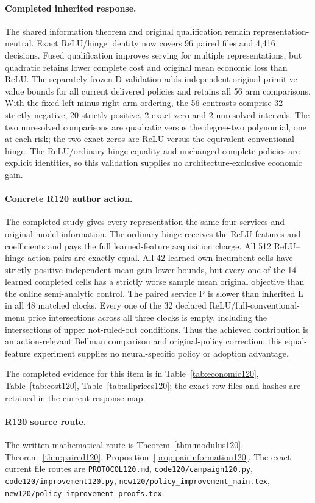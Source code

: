 \paragraph{Completed inherited response.}
The shared information theorem and original qualification remain representation-neutral. Exact ReLU/hinge identity now covers 96 paired files and 4,416 decisions. Fused qualification improves serving for multiple representations, but quadratic retains lower complete cost and original mean economic loss than ReLU. The separately frozen D validation adds independent original-primitive value bounds for all current delivered policies and retains all 56 arm comparisons. With the fixed left-minus-right arm ordering, the 56 contrasts comprise 32 strictly negative, 20 strictly positive, 2 exact-zero and 2 unresolved intervals. The two unresolved comparisons are quadratic versus the degree-two polynomial, one at each risk; the two exact zeros are ReLU versus the equivalent conventional hinge. The ReLU/ordinary-hinge equality and unchanged complete policies are explicit identities, so this validation supplies no architecture-exclusive economic gain.
\paragraph{Concrete R120 author action.}
The completed study gives every representation the same four services and original-model information. The ordinary hinge receives the ReLU features and coefficients and pays the full learned-feature acquisition charge. All 512 ReLU--hinge action pairs are exactly equal. All 42 learned own-incumbent cells have strictly positive independent mean-gain lower bounds, but every one of the 14 learned completed cells has a strictly worse sample mean original objective than the online semi-analytic control. The paired service P is slower than inherited L in all 48 matched clocks. Every one of the 32 declared ReLU/full-conventional-menu price intersections across all three clocks is empty, including the intersections of upper not-ruled-out conditions. Thus the achieved contribution is an action-relevant Bellman comparison and original-policy correction; this equal-feature experiment supplies no neural-specific policy or adoption advantage.

The completed evidence for this item is in Table~\ref{tab:economic120}, Table~\ref{tab:cost120}, Table~\ref{tab:allprices120}; the exact row files and hashes are retained in the current response map.
\paragraph{R120 source route.}
The written mathematical route is Theorem~\ref{thm:modulus120}, Theorem~\ref{thm:paired120}, Proposition~\ref{prop:pairinformation120}. The exact current file routes are \nolinkurl{PROTOCOL120.md}, \nolinkurl{code120/campaign120.py}, \nolinkurl{code120/improvement120.py}, \nolinkurl{new120/policy_improvement_main.tex}, \nolinkurl{new120/policy_improvement_proofs.tex}.
